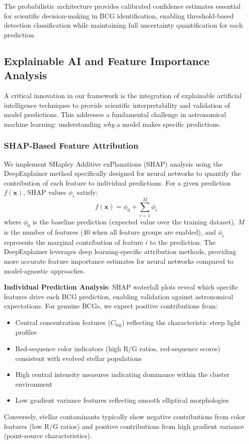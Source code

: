 \documentclass[twocolumn,10pt]{aastex631}
\begin{document}
The probabilistic architecture provides calibrated confidence estimates essential for scientific decision-making in BCG identification, enabling threshold-based detection classification while maintaining full uncertainty quantification for each prediction.

\subsection{Explainable AI and Feature Importance Analysis}

A critical innovation in our framework is the integration of explainable artificial intelligence techniques to provide scientific interpretability and validation of model predictions. This addresses a fundamental challenge in astronomical machine learning: understanding \emph{why} a model makes specific predictions.

\subsubsection{SHAP-Based Feature Attribution}

We implement SHapley Additive exPlanations (SHAP) analysis using the DeepExplainer method specifically designed for neural networks to quantify the contribution of each feature to individual predictions. For a given prediction $f(\mathbf{x})$, SHAP values $\phi_i$ satisfy:
\begin{equation}
f(\mathbf{x}) = \phi_0 + \sum_{i=1}^{M} \phi_i
\end{equation}
where $\phi_0$ is the baseline prediction (expected value over the training dataset), $M$ is the number of features (40 when all feature groups are enabled), and $\phi_i$ represents the marginal contribution of feature $i$ to the prediction. The DeepExplainer leverages deep learning-specific attribution methods, providing more accurate feature importance estimates for neural networks compared to model-agnostic approaches.

\textbf{Individual Prediction Analysis}: SHAP waterfall plots reveal which specific features drive each BCG prediction, enabling validation against astronomical expectations. For genuine BCGs, we expect positive contributions from:
\begin{itemize}
\item Central concentration features ($C_{\text{log}}$) reflecting the characteristic steep light profiles
\item Red-sequence color indicators (high R/G ratios, red-sequence scores) consistent with evolved stellar populations
\item High central intensity measures indicating dominance within the cluster environment
\item Low gradient variance features reflecting smooth elliptical morphologies
\end{itemize}
Conversely, stellar contaminants typically show negative contributions from color features (low R/G ratios) and positive contributions from high gradient variance (point-source characteristics).
\end{document}
